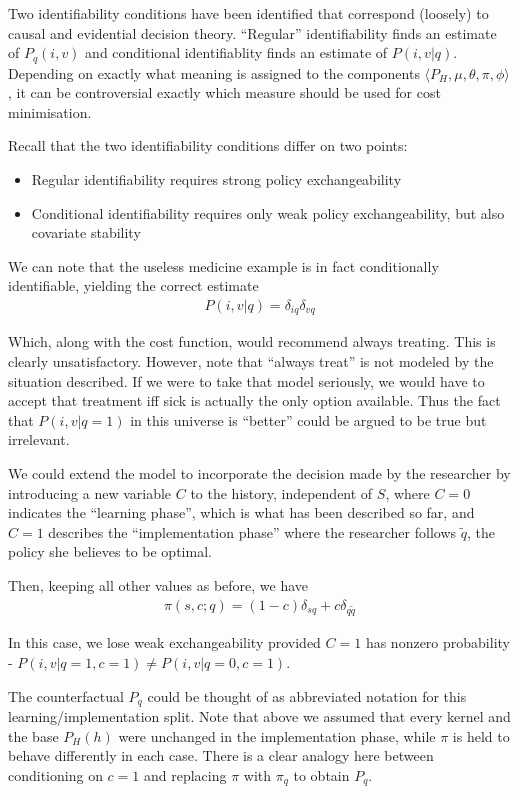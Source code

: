 Two identifiability conditions have been identified that correspond (loosely) to causal and evidential decision theory. ``Regular'' identifiability finds an estimate of $P_q(i,v)$ and conditional identifiablity finds an estimate of $P(i,v|q)$. Depending on exactly what meaning is assigned to the components $\langle P_H, \mu, \theta, \pi, \phi\rangle$, it can be controversial exactly which measure should be used for cost minimisation.

Recall that the two identifiability conditions differ on two points:
\begin{itemize}
    \item Regular identifiability requires strong policy exchangeability
    \item Conditional identifiability requires only weak policy exchangeability, but also covariate stability
\end{itemize}

We can note that the useless medicine example is in fact conditionally identifiable, yielding the correct estimate
\begin{align}
    P(i,v|q) = \delta_{iq} \delta_{vq}
\end{align}

Which, along with the cost function, would recommend always treating. This is clearly unsatisfactory. However, note that ``always treat'' is not modeled by the situation described. If we were to take that model seriously, we would have to accept that treatment iff sick is actually the only option available. Thus the fact that $P(i,v|q=1)$ in this universe is ``better'' could be argued to be true but irrelevant.

We could extend the model to incorporate the decision made by the researcher by introducing a new variable $C$ to the history, independent of $S$, where $C=0$ indicates the ``learning phase'', which is what has been described so far, and $C=1$ describes the ``implementation phase'' where the researcher follows $\tilde{q}$, the policy she believes to be optimal.

Then, keeping all other values as before, we have
\begin{align}
    \pi(s,c;q) = (1-c)\delta_{sq} + c\delta_{q\tilde{q}}
\end{align}

In this case, we lose weak exchangeability provided $C=1$ has nonzero probability - $P(i,v|q=1,c=1)\neq P(i,v|q=0,c=1)$.

The counterfactual $P_q$ could be thought of as abbreviated notation for this learning/implementation split. Note that above we assumed that every kernel and the base $P_H(h)$ were unchanged in the implementation phase, while $\pi$ is held to behave differently in each case. There is a clear analogy here between conditioning on $c=1$ and replacing $\pi$ with $\pi_q$ to obtain $P_q$. 

